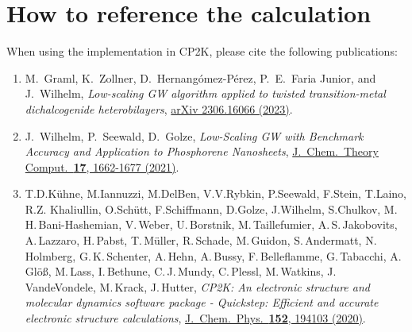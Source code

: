 \documentclass[11pt, a4paper]{scrartcl}
\begin{document}
\section{How to reference the \GW calculation}
When using the \GW implementation in CP2K, please cite the following publications:
\begin{enumerate}[leftmargin=*]

\item M.~Graml, K.~Zollner, D.~Hernangómez-Pérez, P.~E.~Faria Junior, and J.~Wilhelm, \textit{Low-scaling GW algorithm applied to twisted transition-metal dichalcogenide heterobilayers}, \href{
https://doi.org/10.48550/arXiv.2306.16066}{arXiv 2306.16066 (2023)}.

\item J.~Wilhelm, P.~Seewald, D.~Golze, \textit{Low-Scaling GW with Benchmark Accuracy and Application to Phosphorene Nanosheets}, \href{https://doi.org/10.1021/acs.jctc.0c01282}{
J.~Chem.~Theory Comput.~\textbf{17}, 1662-1677 (2021)}.


\item T.\;D.\;Kühne, M.\;Iannuzzi, M.\;Del\;Ben, V.\;V.\;Rybkin, P.\;Seewald, F.\;Stein, T.\;Laino, R.\;Z. Khaliullin, O.\;Schütt, F.\;Schiffmann, D.\;Golze, J.\;Wilhelm, S.\;Chulkov, M.\,H.\,Bani-Hashe\-mian, V.\,Weber, \linebreak U.\,Borst\-nik, M.\,Taillefumier, A.\,S.\,Jakobovits, A.\,Lazzaro, H.\,Pabst,  T.\,Müller,  R.\,Schade, M.\,Guidon, S.\,Ander\-matt, N.\,Holmberg, G.\,K.\,Schenter, A.\,Hehn, A.\,Bussy,  F.\,Belleflamme, G.\,Tabacchi, A.\,Glöß, M.\,Lass, I.\,Bethune, C.\,J.\,Mundy, C.\,Plessl, M.\,Watkins, J.\,VandeVondele, M.\,Krack, J.\,Hutter, \textit{CP2K: An electronic structure and molecular dynamics software package - Quickstep: Efficient and accurate electronic structure calculations}, \href{https://doi.org/10.1063/5.0007045}{J.~Chem.~Phys.~\textbf{152}, 194103 (2020)}.


\end{enumerate}
\end{document}

